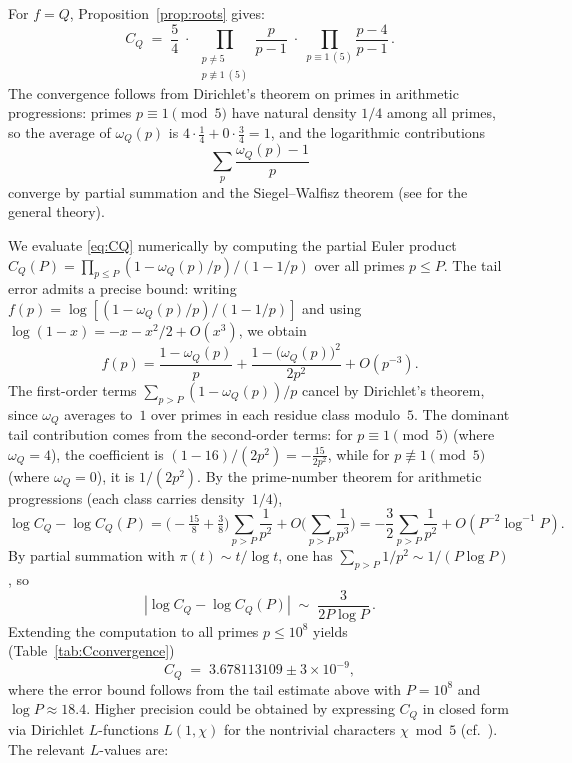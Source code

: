 \documentclass[11pt,a4paper]{article}
\theoremstyle{plain}
\theoremstyle{definition}
\theoremstyle{remark}
\begin{document}
For $f = Q$, Proposition~\ref{prop:roots} gives:
\begin{equation}\label{eq:CQ}
C_Q \;=\; \frac{5}{4}\;\cdot\; \prod_{\substack{p \neq 5 \\ p \not\equiv 1\,(5)}} \frac{p}{p-1} \;\cdot\; \prod_{p \equiv 1\,(5)} \frac{p-4}{p-1}\,.
\end{equation}
The convergence follows from Dirichlet's theorem on primes in arithmetic progressions: primes $p \equiv 1 \pmod{5}$ have natural density $1/4$ among all primes, so the average of $\omega_Q(p)$ is $4 \cdot \frac{1}{4} + 0 \cdot \frac{3}{4} = 1$, and the logarithmic contributions
\[
\sum_p \frac{\omega_Q(p) - 1}{p}
\]
converge by partial summation and the Siegel--Walfisz theorem (see \cite[Ch.~17]{iwaniec2004} for the general theory).

We evaluate \eqref{eq:CQ} numerically by computing the partial Euler product $C_Q(P) = \prod_{p \le P} (1 - \omega_Q(p)/p)/(1 - 1/p)$ over all primes $p \le P$.  The tail error admits a precise bound: writing $f(p) = \log[(1 - \omega_Q(p)/p)/(1 - 1/p)]$ and using $\log(1-x) = -x - x^2/2 + O(x^3)$, we obtain
\begin{equation}\label{eq:tailbound}
f(p) = \frac{1 - \omega_Q(p)}{p} + \frac{1 - \bigl(\omega_Q(p)\bigr)^2}{2p^2} + O(p^{-3}).
\end{equation}
The first-order terms $\sum_{p > P}(1 - \omega_Q(p))/p$ cancel by Dirichlet's theorem, since $\omega_Q$ averages to~$1$ over primes in each residue class modulo~$5$.  The dominant tail contribution comes from the second-order terms: for $p \equiv 1 \pmod{5}$ (where $\omega_Q = 4$), the coefficient is $(1 - 16)/(2p^2) = -\frac{15}{2p^2}$, while for $p \not\equiv 1 \pmod{5}$ (where $\omega_Q = 0$), it is $1/(2p^2)$.  By the prime-number theorem for arithmetic progressions (each class carries density~$1/4$),
\[
\log C_Q - \log C_Q(P) = \Big({-}\tfrac{15}{8} + \tfrac{3}{8}\Big)\sum_{p > P}\frac{1}{p^2} + O\Big(\sum_{p>P}\frac{1}{p^3}\Big) = -\frac{3}{2}\sum_{p > P}\frac{1}{p^2} + O(P^{-2}\log^{-1}\!P).
\]
By partial summation with $\pi(t) \sim t/\!\log t$, one has $\sum_{p > P}1/p^2 \sim 1/(P\log P)$, so
\[
|\log C_Q - \log C_Q(P)| \;\sim\; \frac{3}{2P\log P}\,.
\]
Extending the computation to all primes $p \le 10^8$ yields (Table~\ref{tab:Cconvergence})
\begin{equation}\label{eq:Cvalue}
C_Q \;=\; 3.678113109 \pm 3 \times 10^{-9},
\end{equation}
where the error bound follows from the tail estimate above with $P = 10^8$ and $\log P \approx 18.4$.  Higher precision could be obtained by expressing $C_Q$ in closed form via Dirichlet $L$-functions $L(1, \chi)$ for the nontrivial characters $\chi \bmod 5$ (cf.~\cite{cohen2007,languasco2010}).  The relevant $L$-values are:
\end{document}

